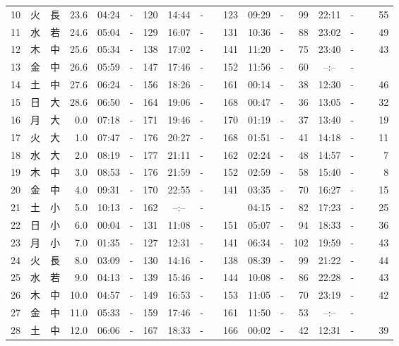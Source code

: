 \documentclass[12pt.a4j]{jsarticle}
\begin{document}
\begin{center}
\begin{table}[ht]
\begin{tabular}{|rc|cr|ccrccr|ccrccr|}
10 & 火 & 長 & 23.6 &  04:24 &-& 120  &  14:44 &-& 123  &   09:29 &-&  99  &   22:11 &-&  55  \\
11 & 水 & 若 & 24.6 &  05:04 &-& 129  &  16:07 &-& 131  &   10:36 &-&  88  &   23:02 &-&  49  \\
12 & 木 & 中 & 25.6 &  05:34 &-& 138  &  17:02 &-& 141  &   11:20 &-&  75  &   23:40 &-&  43  \\
13 & 金 & 中 & 26.6 &  05:59 &-& 147  &  17:46 &-& 152  &   11:56 &-&  60  &   --:-- &-&~~~~~ \\
14 & 土 & 中 & 27.6 &  06:24 &-& 156  &  18:26 &-& 161  &   00:14 &-&  38  &   12:30 &-&  46  \\
15 & 日 & 大 & 28.6 &  06:50 &-& 164  &  19:06 &-& 168  &   00:47 &-&  36  &   13:05 &-&  32  \\
16 & 月 & 大 &  0.0 &  07:18 &-& 171  &  19:46 &-& 170  &   01:19 &-&  37  &   13:40 &-&  19  \\
17 & 火 & 大 &  1.0 &  07:47 &-& 176  &  20:27 &-& 168  &   01:51 &-&  41  &   14:18 &-&  11  \\
18 & 水 & 大 &  2.0 &  08:19 &-& 177  &  21:11 &-& 162  &   02:24 &-&  48  &   14:57 &-&   7  \\
19 & 木 & 中 &  3.0 &  08:53 &-& 176  &  21:59 &-& 152  &   02:59 &-&  58  &   15:40 &-&   8  \\
20 & 金 & 中 &  4.0 &  09:31 &-& 170  &  22:55 &-& 141  &   03:35 &-&  70  &   16:27 &-&  15  \\
21 & 土 & 小 &  5.0 &  10:13 &-& 162  &  --:-- &-&~~~~~ &   04:15 &-&  82  &   17:23 &-&  25  \\
22 & 日 & 小 &  6.0 &  00:04 &-& 131  &  11:08 &-& 151  &   05:07 &-&  94  &   18:33 &-&  36  \\
23 & 月 & 小 &  7.0 &  01:35 &-& 127  &  12:31 &-& 141  &   06:34 &-& 102  &   19:59 &-&  43  \\
24 & 火 & 長 &  8.0 &  03:09 &-& 130  &  14:16 &-& 138  &   08:39 &-&  99  &   21:22 &-&  44  \\
25 & 水 & 若 &  9.0 &  04:13 &-& 139  &  15:46 &-& 144  &   10:08 &-&  86  &   22:28 &-&  43  \\
26 & 木 & 中 & 10.0 &  04:57 &-& 149  &  16:53 &-& 153  &   11:05 &-&  70  &   23:19 &-&  42  \\
27 & 金 & 中 & 11.0 &  05:33 &-& 159  &  17:46 &-& 161  &   11:50 &-&  53  &   --:-- &-&~~~~~ \\
28 & 土 & 中 & 12.0 &  06:06 &-& 167  &  18:33 &-& 166  &   00:02 &-&  42  &   12:31 &-&  39  \\

\end{tabular}
\end{table}
\end{center}
\end{document}
